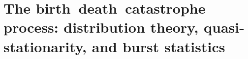 
\chapter{The birth--death--catastrophe process: distribution theory,
quasi-stationarity, and burst statistics}
\label{dist:ch:distribution-theory}














\FloatBarrier
\begingroup
\omitfromtoc
\renewcommand{\theHsection}{\thechapter.appendix.\Alph{section}}
\renewcommand{\theHsubsection}{\theHsection.\arabic{subsection}}
\renewcommand{\theHsubsubsection}{\theHsubsection.\arabic{subsubsection}}



\endgroup
\restoretoc

